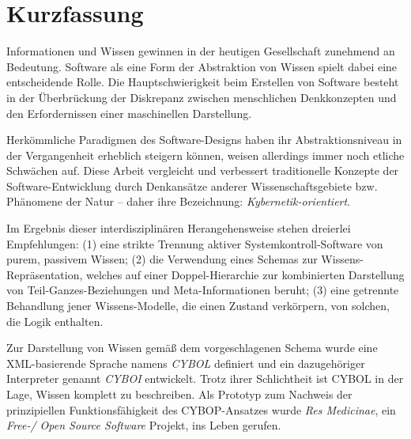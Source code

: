 %
%
%
%
%
%
%

\section{Kurzfassung}
\label{kurzfassung_heading}

Informationen und Wissen gewinnen in der heutigen Gesellschaft zunehmend an
Bedeutung. Software als eine Form der Abstraktion von Wissen spielt dabei eine
entscheidende Rolle. Die Hauptschwierigkeit beim Erstellen von Software besteht
in der \"Uberbr\"uckung der Diskrepanz zwischen menschlichen Denkkonzepten und
den Erfordernissen einer maschinellen Darstellung.

Herk\"ommliche Paradigmen des Software-Designs haben ihr Abstraktionsniveau in
der Vergangenheit erheblich steigern k\"onnen, weisen allerdings immer noch
etliche Schw\"achen auf. Diese Arbeit vergleicht und verbessert traditionelle
Konzepte der Software-Entwicklung durch Denkans\"atze anderer Wissenschaftsgebiete
bzw. Ph\"anomene der Natur -- daher ihre Bezeichnung: \emph{Kybernetik-orientiert}.

Im Ergebnis dieser interdisziplin\"aren Herangehensweise stehen dreierlei
Empfehlungen: (1) eine strikte Trennung aktiver Systemkontroll-Software von purem,
passivem Wissen; (2) die Verwendung eines Schemas zur Wissens-Repr\"asentation,
welches auf einer Doppel-Hierarchie zur kombinierten Darstellung von
Teil-Ganzes-Beziehungen und Meta-Informationen beruht; (3) eine getrennte
Behandlung jener Wissens-Modelle, die einen Zustand verk\"orpern, von solchen,
die Logik enthalten.

Zur Darstellung von Wissen gem\"a\ss{} dem vorgeschlagenen Schema wurde eine
XML-basierende Sprache namens \emph{CYBOL} definiert und ein dazugeh\"origer
Interpreter genannt \emph{CYBOI} entwickelt. Trotz ihrer Schlichtheit ist CYBOL
in der Lage, Wissen komplett zu beschreiben. Als Prototyp zum Nachweis der
prinzipiellen Funktionsf\"ahigkeit des CYBOP-Ansatzes wurde \emph{Res Medicinae},
ein \emph{Free-/ Open Source Software} Projekt, ins Leben gerufen.

